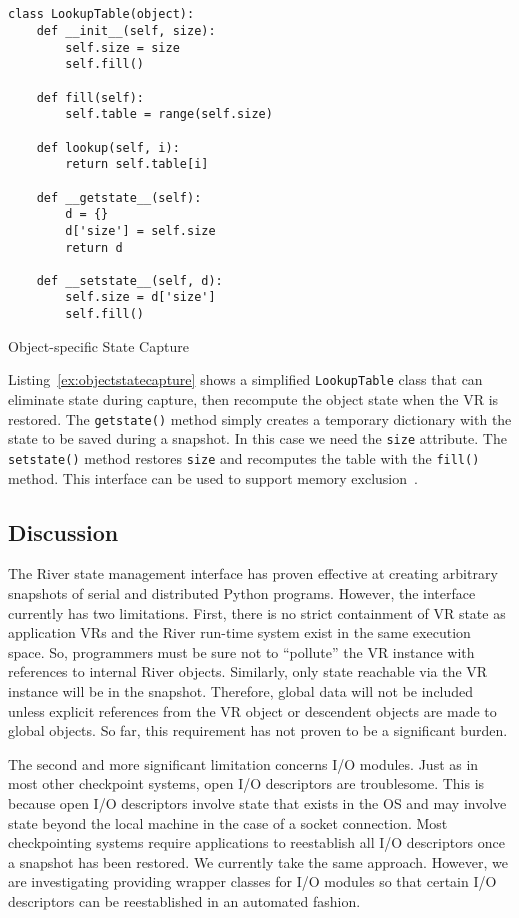 \begin{listing}
\scriptsize
\begin{verbatim}


class LookupTable(object):
    def __init__(self, size):
        self.size = size
        self.fill()

    def fill(self):
        self.table = range(self.size)

    def lookup(self, i):
        return self.table[i]
        
    def __getstate__(self):
        d = {}
        d['size'] = self.size
        return d
        
    def __setstate__(self, d):
        self.size = d['size']
        self.fill()
\end{verbatim}
\normalsize
\caption{Object-specific State Capture}
\label{ex:objectstatecapture}
\end{listing}

Listing~\ref{ex:objectstatecapture} shows a simplified \verb+LookupTable+ class that can eliminate state during capture, then recompute the object state when the VR is restored.  The \verb+getstate()+ method simply creates a temporary dictionary with the state to be saved during a snapshot.  In this case we need the \verb+size+ attribute.  The \verb+setstate()+ method restores \verb+size+ and recomputes the table with the \verb+fill()+ method.  This interface can be used to support memory exclusion~\cite{Plank:1999:CheckpointExclusion}.

\subsection{Discussion}

The River state management interface has proven effective at creating arbitrary snapshots of serial and distributed Python programs.  However, the interface currently has two limitations.  First, there is no strict containment of VR state as application VRs and the River run-time system exist in the same execution space.  So, programmers must be sure not to ``pollute'' the VR instance with references to internal River objects.  Similarly, only state reachable via the VR instance will be in the snapshot.  Therefore, global data will not be included unless explicit references from the VR object or descendent objects are made to global objects.  So far, this requirement has not proven to be a significant burden.

The second and more significant limitation concerns I/O modules.  Just as in most other checkpoint systems, open I/O descriptors are troublesome.  This is because open I/O descriptors involve state that exists in the OS and may involve state beyond the local machine in the case of a socket connection.  Most checkpointing systems require applications to reestablish all I/O descriptors once a snapshot has been restored.  We currently take the same approach.  However, we are investigating providing wrapper classes for I/O modules so that certain I/O descriptors can be reestablished in an automated fashion.
